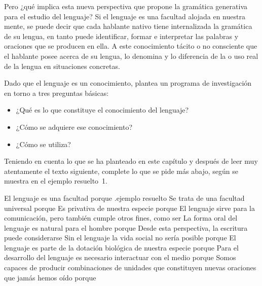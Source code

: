 Pero ¿qué implica esta nueva perspectiva que propone la gramática generativa
para el estudio del lenguaje? Si el lenguaje es una facultad alojada en
nuestra mente, se puede decir que cada hablante nativo tiene internalizada la
gramática de su lengua, en tanto puede identificar, formar e interpretar las
palabras y oraciones que se producen en ella. A este conocimiento tácito o no
consciente que el hablante posee acerca de su lengua, \textcite{chomsky1970}
lo denomina  y lo diferencia de la  o
uso real de la lengua en situaciones concretas.

Dado que el lenguaje es un conocimiento, \textcite{chomsky1989} plantea un
programa de investigación en torno a tres preguntas básicas:

\begin{itemize}
  \item ¿Qué es lo que constituye el conocimiento del lenguaje?
  \item ¿Cómo se adquiere ese conocimiento?
  \item ¿Cómo se utiliza?
\end{itemize}

\begin{ejercicio}\label{ej:01-facultad}
Teniendo en cuenta lo que se ha planteado en este capítulo y después de leer
muy atentamente el texto siguiente, complete lo que se pide más abajo, según
se muestra en el ejemplo resuelto~1.

\begin{exe}
  \ex El lenguaje es una facultad porque .\hfill{\footnotesize\sffamily\color{acento2}ejemplo resuelto}
  \ex Se trata de una facultad universal porque\completar
  \ex Es privativa de nuestra especie porque\completar
  \ex El lenguaje sirve para la comunicación, pero también cumple otros fines,
      como ser\completar
  \ex La forma oral del lenguaje es natural para el hombre porque\completar
  \ex Desde esta perspectiva, la escritura puede considerarse\completar
  \ex Sin el lenguaje la vida social no sería posible porque\completar
  \ex El lenguaje es parte de la dotación biológica de nuestra especie
      porque\completar
  \ex Para el desarrollo del lenguaje es necesario interactuar con el medio
      porque\completar
  \ex Somos capaces de producir combinaciones de unidades que constituyen
      nuevas oraciones que jamás hemos oído porque\completar
\end{exe}
\end{ejercicio}

